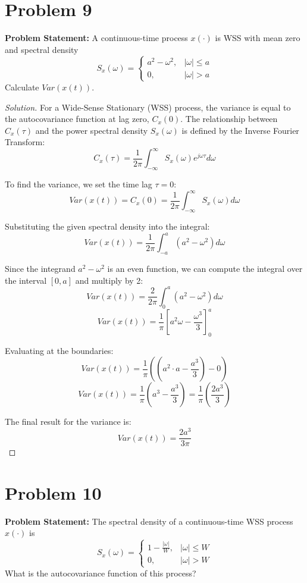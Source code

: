 \documentclass{article}
\begin{document}
\section*{Problem 9}
\textbf{Problem Statement:}
A continuous-time process $x(\cdot)$ is WSS with mean zero and spectral density
\[ S_x(\omega) = \begin{cases} a^2 - \omega^2, & |\omega| \le a \\ 0, & |\omega| > a \end{cases} \]
Calculate $Var(x(t))$.

\begin{proof}[Solution]
	For a Wide-Sense Stationary (WSS) process, the variance is equal to the autocovariance function at lag zero, $C_x(0)$. The relationship between $C_x(\tau)$ and the power spectral density $S_x(\omega)$ is defined by the Inverse Fourier Transform:
	\[ C_x(\tau) = \frac{1}{2\pi} \int_{-\infty}^{\infty} S_x(\omega) e^{j\omega \tau} d\omega \]
	
	To find the variance, we set the time lag $\tau = 0$:
	\[ Var(x(t)) = C_x(0) = \frac{1}{2\pi} \int_{-\infty}^{\infty} S_x(\omega) d\omega \]
	
	Substituting the given spectral density into the integral:
	\[ Var(x(t)) = \frac{1}{2\pi} \int_{-a}^{a} (a^2 - \omega^2) d\omega \]
	
	Since the integrand $a^2 - \omega^2$ is an even function, we can compute the integral over the interval $[0, a]$ and multiply by 2:
	\[ Var(x(t)) = \frac{2}{2\pi} \int_{0}^{a} (a^2 - \omega^2) d\omega \]
	\[ Var(x(t)) = \frac{1}{\pi} \left[ a^2 \omega - \frac{\omega^3}{3} \right]_0^a \]
	
	Evaluating at the boundaries:
	\[ Var(x(t)) = \frac{1}{\pi} \left( (a^2 \cdot a - \frac{a^3}{3}) - 0 \right) \]
	\[ Var(x(t)) = \frac{1}{\pi} \left( a^3 - \frac{a^3}{3} \right) = \frac{1}{\pi} \left( \frac{2a^3}{3} \right) \]
	
	The final result for the variance is:
	\[ Var(x(t)) = \frac{2a^3}{3\pi} \]
\end{proof}

\section*{Problem 10}
\textbf{Problem Statement:}
The spectral density of a continuous-time WSS process $x(\cdot)$ is
\[ S_x(\omega) = \begin{cases} 1 - \frac{|\omega|}{W}, & |\omega| \le W \\ 0, & |\omega| > W \end{cases} \]
What is the autocovariance function of this process?
\end{document}
